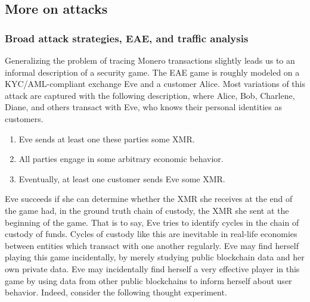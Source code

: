 \documentclass{article}
\theoremstyle{definition}
\begin{document}
\subsection{More on attacks}

\subsubsection{Broad attack strategies, EAE, and traffic analysis}

Generalizing the problem of tracing Monero transactions slightly leads us to an informal description of a security game.
The EAE game is roughly modeled on a KYC/AML-compliant exchange Eve and a customer Alice.
Most variations of this attack are captured with the following description, where Alice, Bob, Charlene, Diane, and others transact with Eve, who knows their personal identities as customers.
\begin{enumerate}
\item Eve sends at least one these parties some XMR.

\item All parties engage in some arbitrary economic behavior.

\item Eventually, at least one customer sends Eve some XMR.
\end{enumerate}
Eve succeeds if she can determine whether the XMR she receives at the end of the game had, in the ground truth chain of custody, the XMR she sent at the beginning of the game.
That is to say, Eve tries to identify cycles in the chain of custody of funds.
Cycles of custody like this are inevitable in real-life economies between entities which transact with one another regularly.
Eve may find herself playing this game incidentally, by merely studying public blockchain data and her own private data.
Eve may incidentally find herself a very effective player in this game by using data from other public blockchains to inform herself about user behavior.
Indeed, consider the following thought experiment.
\end{document}
